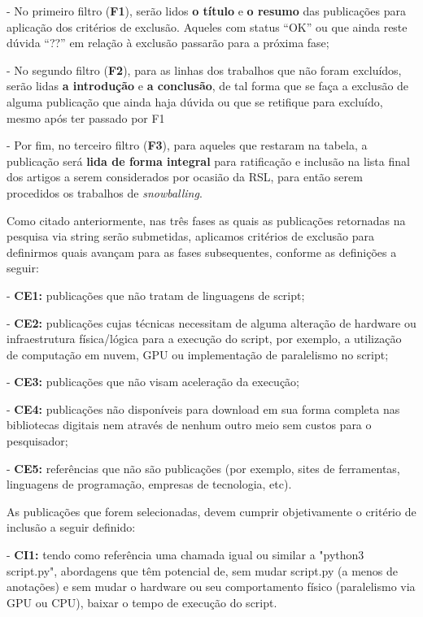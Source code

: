 \documentclass[sigconf]{acmart}
\begin{document}
- No primeiro filtro (\textbf{F1}), serão lidos \textbf{o título} e \textbf {o resumo} das publicações para aplicação dos critérios de exclusão. Aqueles com status “OK” ou que ainda reste dúvida “??” em relação à exclusão passarão para a próxima fase;

- No segundo filtro (\textbf{F2}), para as linhas dos trabalhos que não foram excluídos, serão lidas \textbf{a introdução} e \textbf{a conclusão}, de tal forma que se faça a exclusão de alguma publicação que ainda haja dúvida ou que se retifique para excluído, mesmo após ter passado por F1

- Por fim, no terceiro filtro (\textbf{F3}), para aqueles que restaram na tabela, a publicação será \textbf{lida de forma integral} para ratificação e inclusão na lista final dos artigos a serem considerados por ocasião da RSL, para então serem procedidos os trabalhos de \textit{snowballing}.

Como citado anteriormente, nas três fases as quais as publicações retornadas na pesquisa via string serão submetidas, aplicamos critérios de exclusão para definirmos quais avançam para as fases subsequentes, conforme as definições a seguir:

- \textbf{CE1:} publicações que não tratam de linguagens de script;

- \textbf{CE2:} publicações cujas técnicas necessitam de alguma alteração de hardware ou infraestrutura física/lógica para a execução do script, por exemplo, a utilização de computação em nuvem, GPU ou implementação de paralelismo no script;

- \textbf{CE3:} publicações que não visam aceleração da execução;

- \textbf{CE4:} publicações não disponíveis para download em sua forma completa nas bibliotecas digitais nem através de nenhum outro meio sem custos para o pesquisador;

- \textbf{CE5:} referências que não são publicações (por exemplo, sites de ferramentas, linguagens de programação, empresas de tecnologia, etc).

As publicações que forem selecionadas, devem cumprir objetivamente o critério de inclusão a seguir definido:

- \textbf{CI1:} tendo como referência uma chamada igual ou similar a "python3 script.py", abordagens que têm potencial de, sem mudar script.py (a menos de anotações) e sem mudar o hardware ou seu comportamento físico (paralelismo via GPU ou CPU), baixar o tempo de execução do script.
\end{document}
